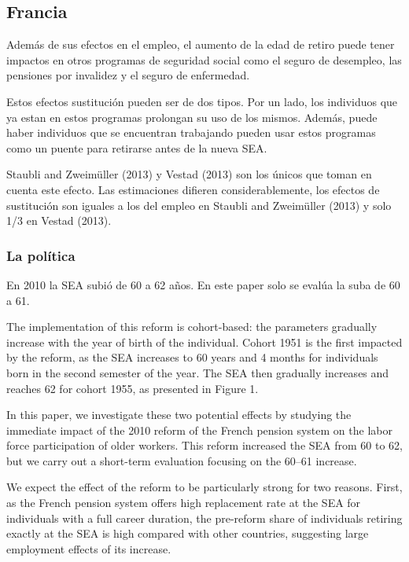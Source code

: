 \documentclass[]{article}
\begin{document}
\hypertarget{francia}{%
\subsection{Francia}\label{francia}}

Además de sus efectos en el empleo, el aumento de la edad de retiro
puede tener impactos en otros programas de seguridad social como el
seguro de desempleo, las pensiones por invalidez y el seguro de
enfermedad.

Estos efectos sustitución pueden ser de dos tipos. Por un lado, los
individuos que ya estan en estos programas prolongan su uso de los
mismos. Además, puede haber individuos que se encuentran trabajando
pueden usar estos programas como un puente para retirarse antes de la
nueva SEA.

Staubli and Zweimüller (2013) y Vestad (2013) son los únicos que toman
en cuenta este efecto. Las estimaciones difieren considerablemente, los
efectos de sustitución son iguales a los del empleo en Staubli and
Zweimüller (2013) y solo 1/3 en Vestad (2013).

\hypertarget{la-poluxedtica-1}{%
\subsubsection{La política}\label{la-poluxedtica-1}}

En 2010 la SEA subió de 60 a 62 años. En este paper solo se evalúa la
suba de 60 a 61.

The implementation of this reform is cohort-based: the parameters
gradually increase with the year of birth of the individual. Cohort 1951
is the first impacted by the reform, as the SEA increases to 60 years
and 4 months for individuals born in the second semester of the year.
The SEA then gradually increases and reaches 62 for cohort 1955, as
presented in Figure 1.

In this paper, we investigate these two potential effects by studying
the immediate impact of the 2010 reform of the French pension system on
the labor force participation of older workers. This reform increased
the SEA from 60 to 62, but we carry out a short-term evaluation focusing
on the 60--61 increase.

We expect the effect of the reform to be particularly strong for two
reasons. First, as the French pension system offers high replacement
rate at the SEA for individuals with a full career duration, the
pre-reform share of individuals retiring exactly at the SEA is high
compared with other countries, suggesting large employment effects of
its increase.
\end{document}
